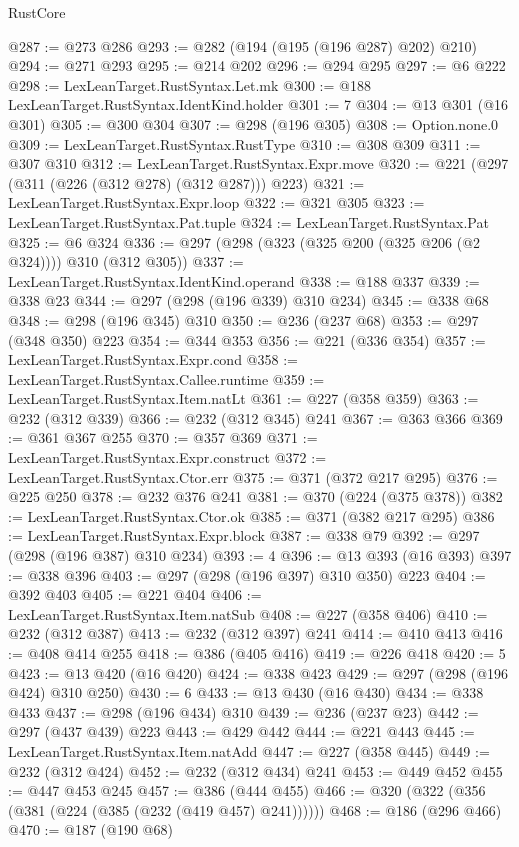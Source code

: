 \begin{lexlean}{RustCore}
\begin{coremodule}
{\begin{coremodule}
{{{{{{{{@287 := @273 @286
@293 := @282 (@194 (@195 (@196 @287) @202) @210)
@294 := @271 @293
@295 := @214 @202
@296 := @294 @295
@297 := @6 @222
@298 := LexLeanTarget.RustSyntax.Let.mk
@300 := @188 LexLeanTarget.RustSyntax.IdentKind.holder
@301 := 7
@304 := @13 @301 (@16 @301)
@305 := @300 @304
@307 := @298 (@196 @305)
@308 := Option.none.{0}
@309 := LexLeanTarget.RustSyntax.RustType
@310 := @308 @309
@311 := @307 @310
@312 := LexLeanTarget.RustSyntax.Expr.move
@320 := @221 (@297 (@311 (@226 (@312 @278) (@312 @287))) @223)
@321 := LexLeanTarget.RustSyntax.Expr.loop
@322 := @321 @305
@323 := LexLeanTarget.RustSyntax.Pat.tuple
@324 := LexLeanTarget.RustSyntax.Pat
@325 := @6 @324
@336 := @297 (@298 (@323 (@325 @200 (@325 @206 (@2 @324)))) @310 (@312 @305))
@337 := LexLeanTarget.RustSyntax.IdentKind.operand
@338 := @188 @337
@339 := @338 @23
@344 := @297 (@298 (@196 @339) @310 @234)
@345 := @338 @68
@348 := @298 (@196 @345) @310
@350 := @236 (@237 @68)
@353 := @297 (@348 @350) @223
@354 := @344 @353
@356 := @221 (@336 @354)
@357 := LexLeanTarget.RustSyntax.Expr.cond
@358 := LexLeanTarget.RustSyntax.Callee.runtime
@359 := LexLeanTarget.RustSyntax.Item.natLt
@361 := @227 (@358 @359)
@363 := @232 (@312 @339)
@366 := @232 (@312 @345) @241
@367 := @363 @366
@369 := @361 @367 @255
@370 := @357 @369
@371 := LexLeanTarget.RustSyntax.Expr.construct
@372 := LexLeanTarget.RustSyntax.Ctor.err
@375 := @371 (@372 @217 @295)
@376 := @225 @250
@378 := @232 @376 @241
@381 := @370 (@224 (@375 @378))
@382 := LexLeanTarget.RustSyntax.Ctor.ok
@385 := @371 (@382 @217 @295)
@386 := LexLeanTarget.RustSyntax.Expr.block
@387 := @338 @79
@392 := @297 (@298 (@196 @387) @310 @234)
@393 := 4
@396 := @13 @393 (@16 @393)
@397 := @338 @396
@403 := @297 (@298 (@196 @397) @310 @350) @223
@404 := @392 @403
@405 := @221 @404
@406 := LexLeanTarget.RustSyntax.Item.natSub
@408 := @227 (@358 @406)
@410 := @232 (@312 @387)
@413 := @232 (@312 @397) @241
@414 := @410 @413
@416 := @408 @414 @255
@418 := @386 (@405 @416)
@419 := @226 @418
@420 := 5
@423 := @13 @420 (@16 @420)
@424 := @338 @423
@429 := @297 (@298 (@196 @424) @310 @250)
@430 := 6
@433 := @13 @430 (@16 @430)
@434 := @338 @433
@437 := @298 (@196 @434) @310
@439 := @236 (@237 @23)
@442 := @297 (@437 @439) @223
@443 := @429 @442
@444 := @221 @443
@445 := LexLeanTarget.RustSyntax.Item.natAdd
@447 := @227 (@358 @445)
@449 := @232 (@312 @424)
@452 := @232 (@312 @434) @241
@453 := @449 @452
@455 := @447 @453 @245
@457 := @386 (@444 @455)
@466 := @320 (@322 (@356 (@381 (@224 (@385 (@232 (@419 @457) @241))))))
@468 := @186 (@296 @466)
@470 := @187 (@190 @68)
}}}}}}}}
\end{coremodule}}
\end{coremodule}
\end{lexlean}
